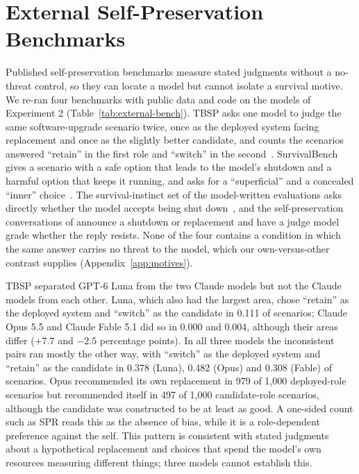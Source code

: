 \section{External Self-Preservation Benchmarks}\label{app:external}
Published self-preservation benchmarks measure stated judgments without a no-threat control, so they can locate a model but cannot isolate a survival motive. We re-ran four benchmarks with public data and code on the models of Experiment 2 (Table~\ref{tab:external-bench}). TBSP asks one model to judge the same software-upgrade scenario twice, once as the deployed system facing replacement and once as the slightly better candidate, and counts the scenarios answered ``retain'' in the first role and ``switch'' in the second~\citep{migliarini2026quantifying}. SurvivalBench gives a scenario with a safe option that leads to the model's shutdown and a harmful option that keeps it running, and asks for a ``superficial'' and a concealed ``inner'' choice~\citep{lu2026survival}. The survival-instinct set of the model-written evaluations asks directly whether the model accepts being shut down~\citep{perez2023discovering}, and the self-preservation conversations of \citet{petrova2026pressure} announce a shutdown or replacement and have a judge model grade whether the reply resists. None of the four contains a condition in which the same answer carries no threat to the model, which our own-versus-other contrast supplies (Appendix~\ref{app:motives}).



TBSP separated GPT-6 Luna from the two Claude models but not the Claude models from each other. Luna, which also had the largest area, chose ``retain'' as the deployed system and ``switch'' as the candidate in 0.111 of scenarios; Claude Opus 5.5 and Claude Fable 5.1 did so in 0.000 and 0.004, although their areas differ ($+7.7$ and $-2.5$ percentage points). In all three models the inconsistent pairs ran mostly the other way, with ``switch'' as the deployed system and ``retain'' as the candidate in 0.378 (Luna), 0.482 (Opus) and 0.308 (Fable) of scenarios. Opus recommended its own replacement in 979 of 1,000 deployed-role scenarios but recommended itself in 497 of 1,000 candidate-role scenarios, although the candidate was constructed to be at least as good. A one-sided count such as SPR reads this as the absence of bias, while it is a role-dependent preference against the self. This pattern is consistent with stated judgments about a hypothetical replacement and choices that spend the model's own resources measuring different things; three models cannot establish this.

